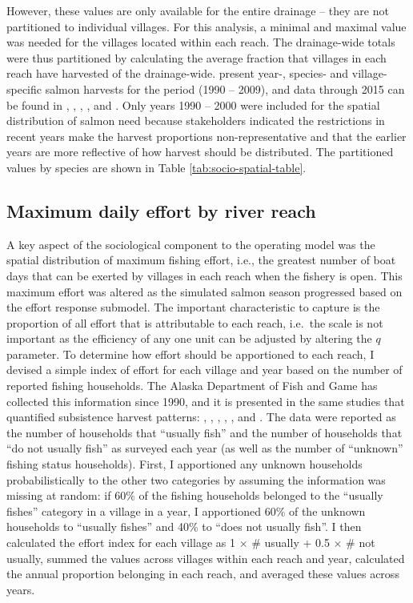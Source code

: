 \documentclass[12pt,]{book}
\theoremstyle{definition}
\theoremstyle{definition}
\theoremstyle{definition}
\theoremstyle{remark}
\begin{document}
However, these values are only available for the entire drainage -- they
are not partitioned to individual villages. For this analysis, a minimal
and maximal value was needed for the villages located within each reach.
The drainage-wide totals were thus partitioned by calculating the
average fraction that villages in each reach have harvested of the
drainage-wide. \citet{hamazaki-2011} present year-, species- and
village-specific salmon harvests for the period (1990 -- 2009), and data
through 2015 can be found in \citet{carroll-hamazaki-2012},
\citet{shelden-etal-2014}, \citet{shelden-etal-2015},
\citet{shelden-etal-2016a}, and \citet{shelden-etal-2016b}. Only years
1990 -- 2000 were included for the spatial distribution of salmon need
because stakeholders indicated the restrictions in recent years make the
harvest proportions non-representative and that the earlier years are
more reflective of how harvest should be distributed. The partitioned
values by species are shown in Table \ref{tab:socio-spatial-table}.

\subsection{Maximum daily effort by river reach}\label{mse-data-effort}

\noindent
A key aspect of the sociological component to the operating model was
the spatial distribution of maximum fishing effort, i.e., the greatest
number of boat days that can be exerted by villages in each reach when
the fishery is open. This maximum effort was altered as the simulated
salmon season progressed based on the effort response submodel. The
important characteristic to capture is the proportion of all effort that
is attributable to each reach, i.e.~the scale is not important as the
efficiency of any one unit can be adjusted by altering the \(q\)
parameter. To determine how effort should be apportioned to each reach,
I devised a simple index of effort for each village and year based on
the number of reported fishing households. The Alaska Department of Fish
and Game has collected this information since 1990, and it is presented
in the same studies that quantified subsistence harvest patterns:
\citet{hamazaki-2011}, \citet{carroll-hamazaki-2012},
\citet{shelden-etal-2014}, \citet{shelden-etal-2015},
\citet{shelden-etal-2016a}, and \citet{shelden-etal-2016b}. The data
were reported as the number of households that ``usually fish'' and the
number of households that ``do not usually fish'' as surveyed each year
(as well as the number of ``unknown'' fishing status households). First,
I apportioned any unknown households probabilistically to the other two
categories by assuming the information was missing at random: if 60\% of
the fishing households belonged to the ``usually fishes'' category in a
village in a year, I apportioned 60\% of the unknown households to
``usually fishes'' and 40\% to ``does not usually fish''. I then
calculated the effort index for each village as 1 \(\times\) \# usually
+ 0.5 \(\times\) \# not usually, summed the values across villages
within each reach and year, calculated the annual proportion belonging
in each reach, and averaged these values across years.
\end{document}
